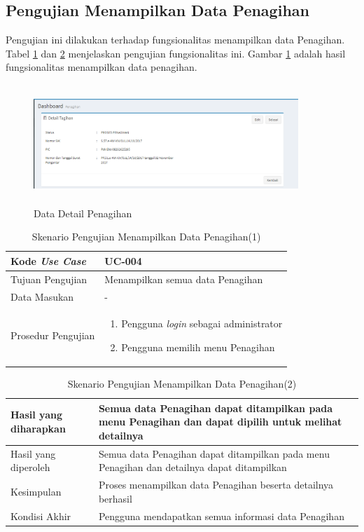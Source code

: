 \subsection{Pengujian Menampilkan Data Penagihan}
Pengujian ini dilakukan terhadap fungsionalitas menampilkan data Penagihan. Tabel \ref{tab:list_penagihan_1} dan \ref{tab:list_penagihan_2} menjelaskan pengujian fungsionalitas ini. Gambar \ref{figure:data_detail_penagihan} adalah hasil fungsionalitas menampilkan data penagihan.
\begin{figure}[h!]
\centerline
{\includegraphics[width=10cm,height=4.5cm]{bab6/detailPenagihan.png}}
\caption{Data Detail Penagihan}
\label{figure:data_detail_penagihan}
\end{figure}

\begin{table}[h!]
	\centering
	\begin{tabular}{|p{4cm}|p{6cm}|}
	\hline
	Kode \textit{Use Case} & UC-004\\ \hline
	Tujuan Pengujian & Menampilkan semua data Penagihan\\ \hline
	Data Masukan & - \\ \hline
	Prosedur Pengujian & 
		\begin{enumerate}
		\item Pengguna \textit{login} sebagai administrator
		\item Pengguna memilih menu Penagihan
		\end{enumerate}\\ \hline
	\end{tabular}\caption{Skenario Pengujian Menampilkan Data Penagihan(1)}
	\label{tab:list_penagihan_1}
\end{table}

\begin{table}[h!]
	\centering
	\begin{tabular}{|p{4cm}|p{6cm}|}
	\hline
	Hasil yang diharapkan & Semua data Penagihan dapat ditampilkan pada menu Penagihan dan dapat dipilih untuk melihat detailnya \\ \hline
	Hasil yang diperoleh & Semua data Penagihan dapat ditampilkan pada menu Penagihan dan detailnya dapat ditampilkan\\ \hline
	Kesimpulan & Proses menampilkan data Penagihan beserta detailnya berhasil\\ \hline
	Kondisi Akhir & Pengguna mendapatkan semua informasi data Penagihan\\ \hline
	\end{tabular}\caption{Skenario Pengujian Menampilkan Data Penagihan(2)}
		\label{tab:list_penagihan_2}
\end{table}

